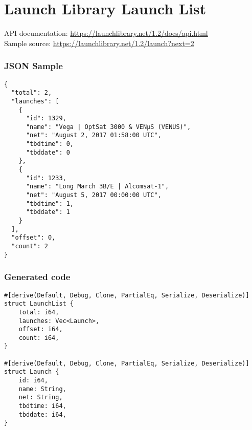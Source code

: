 \section{Launch Library Launch List}
\label{app:launchlibrary}

API documentation: \url{https://launchlibrary.net/1.2/docs/api.html} \\
Sample source: \url{https://launchlibrary.net/1.2/launch?next=2}

\begin{multicols}{2}

\subsubsection{JSON Sample}

\begin{verbatim}
{
  "total": 2,
  "launches": [
    {
      "id": 1329,
      "name": "Vega | OptSat 3000 & VENµS (VENUS)",
      "net": "August 2, 2017 01:58:00 UTC",
      "tbdtime": 0,
      "tbddate": 0
    },
    {
      "id": 1233,
      "name": "Long March 3B/E | Alcomsat-1",
      "net": "August 5, 2017 00:00:00 UTC",
      "tbdtime": 1,
      "tbddate": 1
    }
  ],
  "offset": 0,
  "count": 2
}
\end{verbatim}

\subsubsection{Generated code}

\begin{verbatim}
#[derive(Default, Debug, Clone, PartialEq, Serialize, Deserialize)]
struct LaunchList {
    total: i64,
    launches: Vec<Launch>,
    offset: i64,
    count: i64,
}

#[derive(Default, Debug, Clone, PartialEq, Serialize, Deserialize)]
struct Launch {
    id: i64,
    name: String,
    net: String,
    tbdtime: i64,
    tbddate: i64,
}
\end{verbatim}
\end{multicols}

